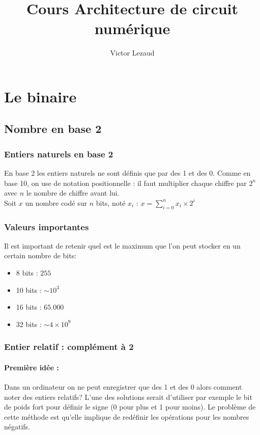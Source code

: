 \documentclass[10pt,a4paper,twoside]{article}
\author{Victor Lezaud}
\title{Cours Architecture de circuit numérique}
\begin{document}
\maketitle
\renewcommand{\contentsname}{Sommaire}
\tableofcontents

\newpage

\section{Le binaire}

\subsection{Nombre en base 2}
\subsubsection{Entiers naturels en base 2}
En base 2 les entiers naturels ne sont définis que par des 1 et des 0. Comme en base 10, on use de notation positionnelle : il faut multiplier chaque chiffre par $2^{n}$ avec $n$ le nombre de chiffre avant lui.\\
Soit $x$ un nombre codé sur $n$ bits, noté $x_{i}$ : $x = \sum_{i=0}^{n}x_{i} \times 2^{i}$
\subsubsection{Valeurs importantes}
Il est important de retenir quel est le maximum que l'on peut stocker en un certain nombre de bits:
\begin{itemize}
\item 8 bits : $255$
\item 10 bits : $\sim 10^{3}$
\item 16 bits : $65.000$
\item 32 bits : $\sim 4\times 10^{9}$
\end{itemize}

\subsubsection{Entier relatif : complément à 2}
\paragraph{Première idée :} Dans un ordinateur on ne peut enregistrer que des 1 et des 0 alors comment noter des entiers relatifs? L'une des solutions serait d'utiliser par exemple le bit de poids fort pour définir le signe (0 pour plus et 1 pour moins). Le problème de cette méthode est qu'elle implique de redéfinir les opérations pour les nombres négatifs.
\end{document}
